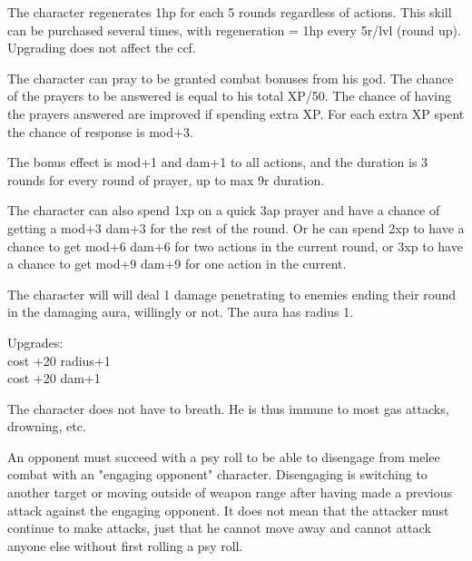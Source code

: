  The character regenerates 1hp for each 5 rounds regardless of actions. This skill can be purchased several times, with regeneration = 1hp every 5r/lvl (round up). Upgrading does not affect the ccf.


 The character can pray to be granted combat bonuses from his god. The chance of the prayers to be answered is equal to his total XP/50. The chance of having the prayers answered are improved if spending extra XP. For each extra XP spent the chance of response is mod+3.

The bonus effect is mod+1 and dam+1 to all actions, and the duration is 3 rounds for every round of prayer, up to max 9r duration.

The character can also spend 1xp on a quick 3ap prayer and have a chance of getting a mod+3 dam+3 for the rest of the round. Or he can spend 2xp to have a chance to get mod+6 dam+6 for two actions in the current round, or 3xp to have a chance to get mod+9 dam+9 for one action in the current. %


 The character will will deal 1 damage penetrating to enemies ending their round in the damaging aura, willingly or not. The aura has radius 1.

Upgrades:\\
cost +20 radius+1 \\
cost +20 dam+1


 The character does not have to breath. He is thus immune to most gas attacks, drowning, etc.


 An opponent must succeed with a psy roll to be able to disengage from melee combat with an "engaging opponent" character. Disengaging is switching to another target or moving outside of weapon range after having made a previous attack against the engaging opponent. It does not mean that the attacker must continue to make attacks, just that he cannot move away and cannot attack anyone else without first rolling a psy roll.


